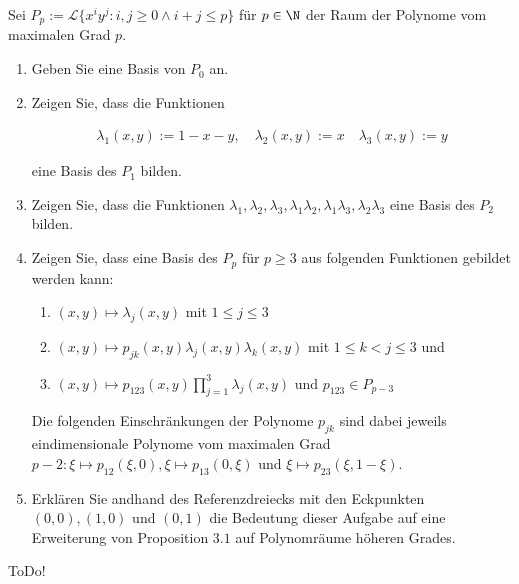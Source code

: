 
\begin{exercise}

Sei $P_p:= \mathcal{L}\{x^i y^j: i,j \geq 0 \land i+j \leq p\}$ für $p \in \N$ der Raum
der Polynome vom maximalen Grad $p$.

\begin{enumerate}[label = \textbf{\alph*)}]
  \item Geben Sie eine Basis von $P_0$ an.
  \item Zeigen Sie, dass die Funktionen

  \begin{align}
    \lambda_1(x,y) := 1-x-y, \quad \lambda_2(x,y) := x \quad \lambda_3(x,y) := y
  \end{align}

  eine Basis des $P_1$ bilden.
  \item Zeigen Sie, dass die Funktionen $\lambda_1, \lambda_2, \lambda_3, \lambda_1\lambda_2, \lambda_1\lambda_3, \lambda_2\lambda_3$
  eine Basis des $P_2$ bilden.
  \item Zeigen Sie, dass eine Basis des $P_p$ für $p \geq 3$ aus folgenden Funktionen gebildet werden kann:
  \begin{enumerate}[label = (\roman*)]
    \item $(x,y) \mapsto \lambda_j(x,y)$ mit $1 \leq j \leq 3$
    \item $(x,y) \mapsto p_{jk}(x,y)\lambda_j(x,y)\lambda_k(x,y)$ mit $1 \leq k < j \leq 3$ und
    \item $(x,y) \mapsto p_{123}(x,y) \prod_{j=1}^3 \lambda_j(x,y)$ und $p_{123} \in P_{p-3}$
  \end{enumerate}
  Die folgenden Einschränkungen der Polynome $p_{jk}$ sind dabei jeweils eindimensionale Polynome vom maximalen
  Grad $p-2: \xi \mapsto p_{12}(\xi,0), \xi \mapsto p_{13}(0,\xi)$ und $\xi \mapsto p_{23}(\xi, 1-\xi)$.
  \item Erklären Sie andhand des Referenzdreiecks mit den Eckpunkten $(0,0), (1,0)$ und $(0,1)$
  die Bedeutung dieser Aufgabe auf eine Erweiterung von Proposition $3.1$ auf Polynomräume höheren Grades.
\end{enumerate}

\end{exercise}


\begin{solution}

ToDo!

\end{solution}

